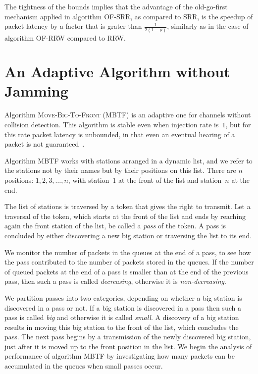 \documentclass[11pt]{article}
\begin{document}
The tightness of the bounds implies that the advantage of the old-go-first mechanism applied in algorithm \textsc{OF-SRR}, as compared to \textsc{SRR}, is the speedup of packet latency by a factor that is  grater than $\frac{1}{2(1-\rho)}$, similarly as in the case of algorithm \textsc{OF-RRW} compared to \textsc{RRW}.



\section{An Adaptive Algorithm without Jamming}

\label{sec:adaptive-algorithms-without-jamming}



Algorithm \textsc{Move-Big-To-Front} (\textsc{MBTF}) is an adaptive one for channels without collision detection.
This algorithm is stable even when injection rate is~$1$, but for this rate packet latency is unbounded, in that even an eventual hearing of a packet is not guaranteed~\cite{ChlebusKR09}.

Algorithm \textsc{MBTF} works with stations arranged in a dynamic list, and we refer to the stations not by their names but by their positions on this list.
There are $n$ positions: $1,2,3,\ldots, n$, with station~$1$ at the front of the list  and station~$n$ at the end.

The list of stations is traversed by a token that gives the right to transmit.
Let a traversal of the token, which starts at the front of the list and ends by reaching again the front station of the list, be called a \emph{pass} of the token.
A pass is concluded by either discovering a new big station or traversing the list to its end.  

We monitor the number of packets in the queues at the end of a pass, to see how the pass contributed to  the number of packets stored in the queues.
If the number of queued packets  at the end of a pass is smaller than at the end of the previous pass, then such a pass  is called \emph{decreasing}, otherwise it is \emph{non-decreasing}.

We partition passes into two categories, depending on whether a big station is discovered in a pass or not.
If a big station is discovered in a pass then such a pass is called \emph{big} and otherwise it is called \emph{small}.
A discovery of a big station results in moving this big station to the front of the list, which concludes  the pass.
The next pass begins by a transmission of the newly discovered big station, just after it is  moved up to the front position in the list.
We begin the analysis of performance of algorithm \textsc{MBTF} by investigating how many packets can be accumulated in the queues when small passes occur.
\end{document}
